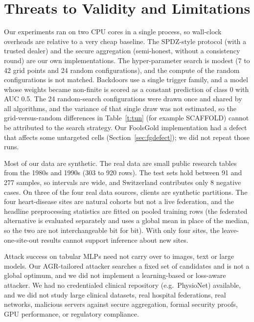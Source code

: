 \documentclass[conference]{IEEEtran}
\begin{document}
\section{Threats to Validity and Limitations}
Our experiments ran on two CPU cores in a single process, so wall-clock overheads are relative to a very cheap baseline. The SPDZ-style protocol (with a trusted dealer) and the secure aggregation (semi-honest, without a consistency round) are our own implementations. The hyper-parameter search is modest (7 to 42 grid points and 24 random configurations), and the compute of the random configurations is not matched. Backdoors use a single trigger family, and a model whose weights became non-finite is scored as a constant prediction of class 0 with AUC 0.5. The 24 random-search configurations were drawn once and shared by all algorithms, and the variance of that single draw was not estimated, so the grid-versus-random differences in Table~\ref{t:tun} (for example SCAFFOLD) cannot be attributed to the search strategy. Our FoolsGold implementation had a defect that affects some untargeted cells (Section~\ref{sec:fgdefect}); we did not repeat those runs.

Most of our data are synthetic. The real data are small public research tables from the 1980s and 1990s (303 to 920 rows). The test sets hold between 91 and 277 samples, so intervals are wide, and Switzerland contributes only 8 negative cases. On three of the four real data sources, clients are synthetic partitions. The four heart-disease sites are natural cohorts but not a live federation, and the headline preprocessing statistics are fitted on pooled training rows (the federated alternative is evaluated separately and uses a global mean in place of the median, so the two are not interchangeable bit for bit). With only four sites, the leave-one-site-out results cannot support inference about new sites.

Attack success on tabular MLPs need not carry over to images, text or large models. Our AGR-tailored attacker searches a fixed set of candidates and is not a global optimum, and we did not implement a learning-based or loss-aware attacker. We had no credentialed clinical repository (e.g.\ PhysioNet) available, and we did not study large clinical datasets, real hospital federations, real networks, malicious servers against secure aggregation, formal security proofs, GPU performance, or regulatory compliance.
\end{document}
